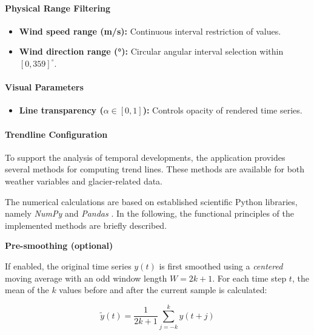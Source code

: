 \paragraph{Physical Range Filtering}
\begin{itemize}
    \item \textbf{Wind speed range (m/s):} 
    Continuous interval restriction of values.
    
    \item \textbf{Wind direction range (°):} 
    Circular angular interval selection within $[0,359]^\circ$.
\end{itemize}


\paragraph{Visual Parameters}
\begin{itemize}
    \item \textbf{Line transparency ($\alpha \in [0,1]$):} 
    Controls opacity of rendered time series.
\end{itemize}



\paragraph{Trendline Configuration}

To support the analysis of temporal developments, the application provides several methods for computing trend lines.
These methods are available for both weather variables and glacier-related data.

The numerical calculations are based on established scientific Python 
libraries, namely \textit{NumPy} and \textit{Pandas} 
\parencite{numpy_harris_2020, pandas_mckinney_2010}. 
In the following, the functional principles of the implemented methods are briefly described.

\vspace{1em}
\noindent\textbf{Pre-smoothing (optional)}

If enabled, the original time series $y(t)$ is first smoothed using a
\emph{centered} moving average with an odd window length $W = 2k+1$. For each
time step $t$, the mean of the $k$ values before and after the current sample
is calculated:

\begin{equation}
\tilde{y}(t) = \frac{1}{2k+1} \sum_{j=-k}^{k} y(t+j)
\end{equation}

